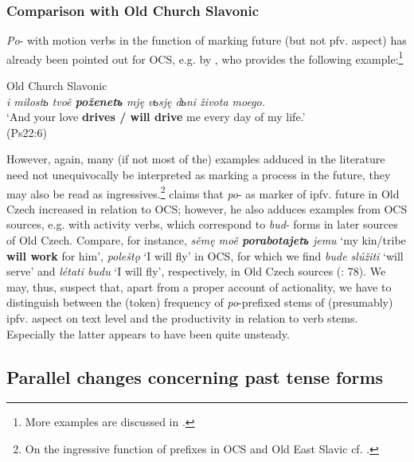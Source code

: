 \documentclass[output=paper,colorlinks,citecolor=brown]{langscibook}
\begin{document}
\subsubsection{Comparison with Old Church Slavonic} \label{sec:wiemer:4.2.2}
\textit{Po}- with motion verbs in the function of marking future (but not pfv. aspect) has already been pointed out for OCS, e.g. by \citet[274]{Němec2009b}, who provides the following example:\footnote{More examples are discussed in \citet[283, 299]{Dostál1954}.}


\ea \label{ex:wiemer:34} Old Church Slavonic\\
    \textit{i milostь tvoě \textbf{poženetъ} mję vьsję dьni života moego.}\\
    ‘And your love \textbf{drives / will drive} me every day of my life.’\\
    \hfill (Ps22:6)
\z

However, again, many (if not most of the) examples adduced in the literature need not unequivocally be interpreted as marking a process in the future, they may also be read as ingressives.\footnote{On the ingressive function of prefixes in OCS and Old East Slavic cf. \citet{eckhoff_2017}.} \citet[77]{Šlosar1981} claims that \textit{po}- as marker of ipfv. future in Old Czech increased in relation to OCS; however, he also adduces examples from OCS sources, e.g. with activity verbs, which correspond to \textit{bud}- forms in later sources of Old Czech. Compare, for instance, \textit{sěmę moě \textbf{porabotajetъ} jemu} ‘my kin/tribe \textbf{will work} for him’, \textit{poleštǫ} ‘I will fly’ in OCS, for which we find \textit{bude slúžiti} ‘will serve’ and \textit{létati budu }‘I will fly’, respectively, in Old Czech sources (\cite{Šlosar1981}: 78). We may, thus, suspect that, apart from a proper account of actionality, we have to distinguish between the (token) frequency of \textit{po}-prefixed stems of (presumably) ipfv. aspect on text level and the productivity in relation to verb stems. Especially the latter appears to have been quite unsteady.



\subsection{Parallel changes concerning past tense forms}\label{sec:wiemer:4.3}
\end{document}
